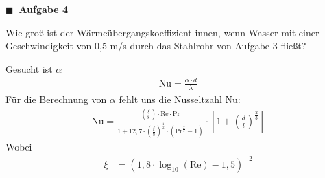 \documentclass[aspectratio=169,9pt]{beamer}
\newcommand{\antwort}[1]{
\begin{tcolorbox}[
	enhanced,
	colframe=unigrau!65,
	sharp corners,
	boxsep=1pt,
	colback=white,
	coltitle=black,
]
	#1
	\end{tcolorbox}
}
\begin{document}
\begin{frame}
\begin{minipage}{.4\textwidth}
{\color{miugray}$\blacksquare ~$} \textbf{Aufgabe 4} \par \vspace*{2mm}
Wie groß ist der Wärmeübergangskoeffizient innen, wenn Wasser mit einer
Geschwindigkeit von 0,5 m/s durch das Stahlrohr von Aufgabe 3 fließt?
\begin{table}[h]
\centering
\caption{Eigenschaften von Wasser bei 80 °C}
\end{table}

\end{minipage}%
\hspace*{4mm}
\begin{minipage}{.6\textwidth}
\antwort{
\footnotesize
Gesucht ist $\alpha$
\begin{align}
\text{Nu} = \frac{\alpha \cdot d}{\lambda}
\end{align}
\uncover<2->{
\begin{align} \label{alpha}
\alpha = \frac{\text{Nu} \cdot \lambda}{d}
\end{align}}
Für die Berechnung von $\alpha$ fehlt uns die Nusseltzahl Nu:
\begin{align}\label{nus}
\text{Nu} = \frac{(\frac{\xi}{8}) \cdot \text{Re} \cdot \text{Pr}}{1 + 12,7 \cdot (\frac{\xi}{8})^{\frac{1}{2}} \cdot (\text{Pr}^{\frac{2}{3}}-1)} \cdot \left[ 1 + (\frac{d}{l})^{\frac{2}{3}} \right]
\end{align}
Wobei
\begin{align}
\xi &= (1,8 \cdot \log_{10} (\text{Re}) - 1,5)^{-2}
\end{align}
}
\end{minipage}%
\end{frame}
\end{document}
